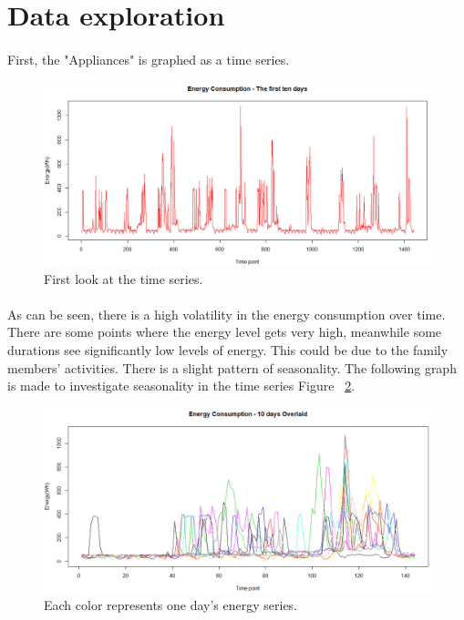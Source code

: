 \documentclass[12pt]{article}
\begin{document}
\section{Data exploration}
\paragraph{}
First, the "Appliances" is graphed as a time series.
\begin{figure}[H]
  \includegraphics[width=\linewidth]{figure2.png}
  \caption{First look at the time series.}
  \label{fig:figure2}
\end{figure}

\paragraph{}
As can be seen, there is a high volatility in the energy consumption over time. There are some points where the energy level gets very high, meanwhile some durations see significantly low levels of energy. This could be due to the family members' activities. There is a slight pattern of seasonality. The following graph is made to investigate seasonality in the time series Figure ~\ref{fig:figure3}.
\begin{figure}[H]
  \includegraphics[width=\linewidth]{figure3.png}
  \caption{Each color represents one day's energy series.}
  \label{fig:figure3}
\end{figure}
\end{document}
